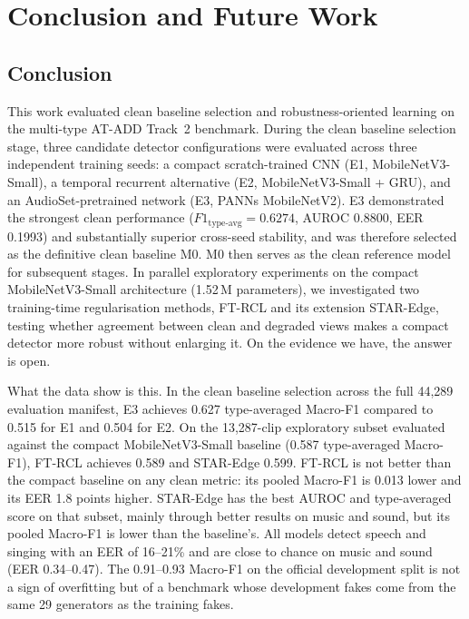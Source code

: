 \chapter{Conclusion and Future Work}
\label{ch:conclusion}

\section{Conclusion}

This work evaluated clean baseline selection and robustness-oriented learning on the multi-type AT-ADD Track~2 benchmark. During the clean baseline selection stage, three candidate detector configurations were evaluated across three independent training seeds: a compact scratch-trained CNN (E1, MobileNetV3-Small), a temporal recurrent alternative (E2, MobileNetV3-Small + GRU), and an AudioSet-pretrained network (E3, PANNs MobileNetV2). E3 demonstrated the strongest clean performance ($F1_{\mathrm{type\text{-}avg}}=0.6274$, AUROC 0.8800, EER 0.1993) and substantially superior cross-seed stability, and was therefore selected as the definitive clean baseline M0. M0 then serves as the clean reference model for subsequent stages. In parallel exploratory experiments on the compact MobileNetV3-Small architecture (1.52\,M parameters), we investigated two training-time regularisation methods, FT-RCL and its extension STAR-Edge, testing whether agreement between clean and degraded views makes a compact detector more robust without enlarging it. On the evidence we have, the answer is open.

What the data show is this. In the clean baseline selection across the full 44{,}289 evaluation manifest, E3 achieves 0.627 type-averaged Macro-F1 compared to 0.515 for E1 and 0.504 for E2. On the 13{,}287-clip exploratory subset evaluated against the compact MobileNetV3-Small baseline (0.587 type-averaged Macro-F1), FT-RCL achieves 0.589 and STAR-Edge 0.599. FT-RCL is not better than the compact baseline on any clean metric: its pooled Macro-F1 is 0.013 lower and its EER 1.8 points higher. STAR-Edge has the best AUROC and type-averaged score on that subset, mainly through better results on music and sound, but its pooled Macro-F1 is lower than the baseline's. All models detect speech and singing with an EER of 16--21\% and are close to chance on music and sound (EER 0.34--0.47). The 0.91--0.93 Macro-F1 on the official development split is not a sign of overfitting but of a benchmark whose development fakes come from the same 29 generators as the training fakes.

